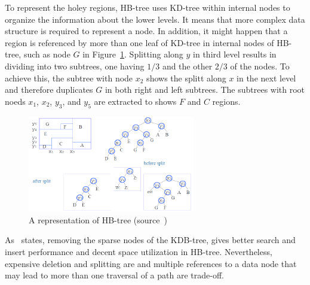 \documentclass[a4paper,12pt]{article}
\begin{document}
To represent the holey regions, HB-tree uses KD-tree within internal nodes to organize the information about the lower levels. It means that more complex data structure is required to represent a node. In addition, it might happen that a region is referenced by more than one leaf of KD-tree in internal nodes of HB-tree, such as node $G$ in Figure~\ref{fighbtree}. Splitting along $y$ in third level results in dividing into two subtrees, one having $1/3$ and the other $2/3$ of the nodes. To achieve this, the subtree with node $x_2$ shows the splitt along $x$ in the next level and therefore duplicates $G$ in both right and left subtrees. The subtrees with root noeds $x_1$, $x_2$, $y_3$, and $y_5$ are extracted to shows $F$ and $C$ regions.

\begin{figure}
\centering
\includegraphics[width=0.65\textwidth,height=0.2\textheight]{hbtree}
\caption{A representation of HB-tree (source~\cite{hbtree1})}
\label{fighbtree}
\end{figure}

As~\cite{hbtree1} states, removing the sparse nodes of the KDB-tree, gives better search and insert performance and decent space utilization in HB-tree. Nevertheless, expensive deletion and splitting are and multiple references to a data node that may lead to more than one traversal of a path are trade-off.
\end{document}
